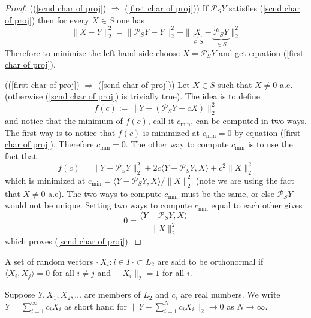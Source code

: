 \begin{proof}
((\ref{scnd char of proj}) $ \Rightarrow $ (\ref{first char of proj})) 
If $\mathcal P_SY$ satisfies (\ref{scnd char of proj}) then for every $X \in S$ one has
\[ \| X - Y \|_2^2 = \| \mathcal P_S Y -Y \|_2^2 + \| \underbrace{ X }_{\in S} - \underbrace{\mathcal P_S Y }_{\in S}\|_2^2 \]
Therefore to minimize the left hand side choose $X = \mathcal P_S Y$ and get equation (\ref{first char of proj}).


((\ref{first char of proj}) $ \Rightarrow $ (\ref{scnd char of proj})) 
Let $X\in S$ such that $X \neq 0$ a.e. (otherwise (\ref{scnd char of proj}) is trivially true). The idea is to define
\[f(c) := \|Y - (\mathcal P_S Y - cX)  \|_2^2  \]
and notice that the minimum of $f(c)$, call it $c_\text{min}$, can be computed in two ways. The first way is to  notice that $f(c)$ is minimized at $c_\text{min} = 0$ by equation (\ref{first char of proj}). Therefore $c_\text{min} = 0$. The other way to compute $c_\text{min}$ is to use the fact that
\[f(c) = \|Y - \mathcal P_SY\|^2_2 + 2c\langle Y - \mathcal P_SY, X\rangle + c^2\|X\|^2_2  \]
which is minimized at $c_\text{min} = \langle Y - \mathcal P_SY, X\rangle / \|X \|^2_2 $ (note we are using the fact that $X \neq 0$ a.e). The two ways to compute $c_\text{min}$ must be the same, or else $\mathcal P_S Y$ would not be unique. Setting two ways to compute $c_\text{min}$ equal to each other gives
\[ 0 = \frac{\langle Y - \mathcal P_SY, X\rangle} { \|X \|^2_2 }  \]
which proves (\ref{scnd char of proj}).
\end{proof}


\begin{definition}
A set of random vectors $\{ X_i:i\in I\}\subset L_2$ are said to be orthonormal if $\langle X_i, X_j\rangle = 0$ for all $i\neq j$ and $\| X_i\|_2=1$ for all $i$.
\end{definition}


\begin{definition}
Suppose $Y, X_1, X_2, \ldots$ are members of $L_2$ and $c_i$ are real numbers. We write $Y = \sum_{i=1}^\infty c_i X_i$ as short hand for $\| Y - \sum_{i=1}^N c_i X_i \|_2\rightarrow 0$ as $N\rightarrow \infty$.
\end{definition}



